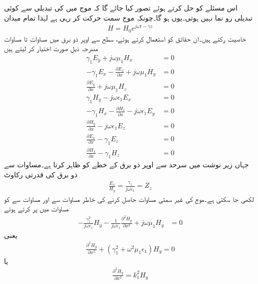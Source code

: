 اس مسئلے کو حل کرتے ہوئے تصور کیا جائے گا کہ موج میں   کی تبدیلی سے کوئی تبدیلی رو نما نہیں ہوتی۔یوں  ہو گا۔چونکہ موج  سمت حرکت کر رہی ہے لہٰذا تمام میدان
\begin{align}\label{مساوات_مویج_حرکت_کرتی_موج_عمومی}
H=H_0 e^{j\omega t -\gamma z}
\end{align}
خاصیت رکتے ہیں۔ان حقائق کو استعمال کرتے ہوئے، سطح سے اوپر ذو برق میں مساوات  تا مساوات  مندرجہ ذیل صورت اختیار کر لیتے ہیں
\begin{align}
\gamma_1  E_y+j\omega \mu_1 H_x&=0 \label{مساوات_مویج_سطح_الف}\\
-\gamma_1  E_x-\frac{\partial E_z}{\partial x}+j\omega\mu_1  H_y&=0 \label{مساوات_مویج_سطح_ب}\\
\frac{\partial E_y}{\partial x}+j\omega\mu_1  H_z&=0 \label{مساوات_مویج_سطح_پ}\\
\gamma_1 H_y-j\omega\epsilon_1  E_x&=0 \label{مساوات_مویج_سطح_ت}\\
-\gamma_1 H_x-\frac{\partial H_z}{\partial x}-j\omega\epsilon_1  E_y&=0 \label{مساوات_مویج_سطح_ٹ}\\
\frac{\partial H_y}{\partial x}-j\omega\epsilon_1 E_z&=0 \label{مساوات_مویج_سطح_ث}\\
\frac{\partial E_x}{\partial x}-\gamma_1  E_z&=0\label{مساوات_مویج_سطح_ج}\\
\frac{\partial H_x}{\partial x}-\gamma_1  H_z&=0 \label{مساوات_مویج_سطح_چ}
\end{align}
جہاں زیر نوشت میں  سرحد سے اوپر ذو برق کے خطے کو ظاہر کرتا ہے۔مساوات  سے ذو برق کی قدرتی رکاوٹ 
\begin{align}\label{مساوات_مویج_ذو_برق_قدرتی_رکاوٹ}
\frac{E_x}{H_y}=\frac{\gamma_1}{j\omega \epsilon_1}=Z_z
\end{align}
لکھی جا سکتی ہے۔موج کی غیر سمتی مساوات  حاصل کرنے کی خاطر مساوات  سے  اور مساوات  سے  کو مساوات  میں پر کرتے ہوئے
\begin{align*}
-\frac{\gamma_1^2}{j\omega \epsilon_1}  H_y-\frac{1}{j\omega \epsilon_1}\frac{\partial^2 H_y}{\partial x^2}+j\omega\mu_1  H_y&=0
\end{align*}
یعنی
\begin{align*}
\frac{\partial^2 H_y}{\partial x^2}+\left(\gamma_1^2+\omega^2 \mu_1 \epsilon_1 \right) H_y=0
\end{align*}
یا
\begin{align}\label{مساوات_مویج_سطح_ذو_برق_موج}
\frac{\partial^2 H_y}{\partial x^2}= k_1^2H_y
\end{align}
